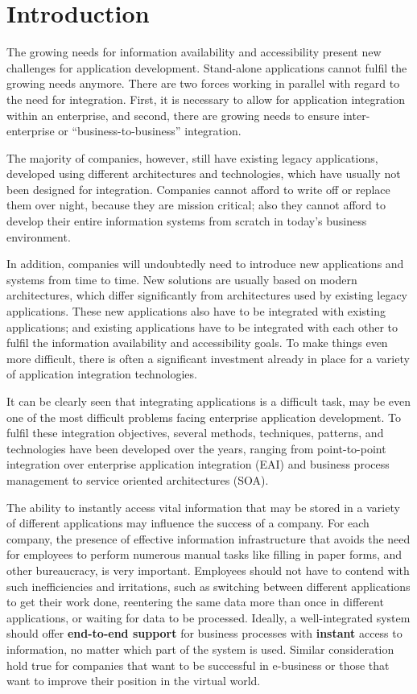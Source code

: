 \chapter{Introduction}

The growing needs for information availability and accessibility present new challenges for application development. Stand-alone applications cannot fulfil the growing needs anymore. There are two forces working in parallel with regard to the need for integration. First, it is necessary to allow for application integration within an enterprise, and second, there are growing needs to ensure inter-enterprise or ``business-to-business'' integration.

The majority of companies, however, still have existing legacy applications, developed using different architectures and technologies, which have usually not been designed for integration. Companies cannot afford to write off or replace them over night, because they are mission critical; also they cannot afford to develop their entire information systems from scratch in today's business environment.

In addition, companies will undoubtedly need to introduce new applications and systems from time to time. New solutions are usually based on modern architectures, which differ significantly from architectures used by existing legacy applications. These new applications also have to be integrated with existing applications; and existing applications have to be integrated with each other to fulfil the information availability and accessibility goals. To make things even more difficult, there is often a significant investment already in place for a variety of application integration technologies.

It can be clearly seen that integrating applications is a difficult task, may be even one of the most difficult problems facing enterprise application development. To fulfil these integration objectives, several methods, techniques, patterns, and technologies have been developed over the years, ranging from point-to-point integration over enterprise application integration (EAI) and business process management to service oriented architectures (SOA).

The ability to instantly access vital information that may be stored in a variety of different applications may influence the success of a company. For each company, the presence of effective information infrastructure that avoids the need for employees to perform numerous manual tasks like filling in paper forms, and other bureaucracy, is very important. Employees should not have to contend with such inefficiencies and irritations, such as switching between different applications to get their work done, reentering the same data more than once in different applications, or waiting for data to be processed. Ideally, a well-integrated system should offer \textbf{end-to-end support} for business processes with \textbf{instant} access to information, no matter which part of the system is used. Similar consideration hold true for companies that want to be successful in e-business or those that want to improve their position in the virtual world. 

